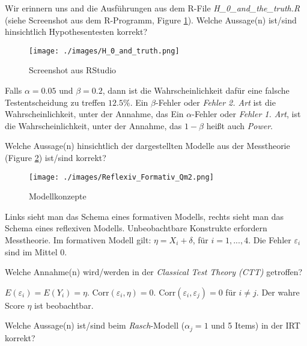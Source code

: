 \documentclass[10pt,addpoints]{exam}
\begin{document}
\begin{questions}
\question Wir erinnern uns and die Ausführungen aus dem R-File \textit{H\_0\_and\_the\_truth.R} (siehe Screenshot aus dem R-Programm, Figure \ref{fig:screenshot_RStudio}). Welche Aussage(n) ist/sind hinsichtlich Hypothesentesten korrekt?

\begin{figure}[H]
\centering
\texttt{[image: ./images/H\_0\_and\_truth.png]}
\caption{Screenshot aus RStudio}
\label{fig:screenshot_RStudio}
\end{figure}

\begin{choices}
\CorrectChoice Falls $\alpha=0.05$ und $\beta=0.2$, dann ist die Wahrscheinlichkeit dafür eine falsche Testentscheidung zu treffen $12.5\%$.
\CorrectChoice Ein $\beta$-Fehler oder \textit{Fehler 2. Art} ist die Wahrscheinlichkeit, unter der Annahme, das
\CorrectChoice Ein $\alpha$-Fehler oder \textit{Fehler 1. Art}, ist die Wahrscheinlichkeit, unter der Annahme, das
\CorrectChoice $1-\beta$ heißt auch \textit{Power}.
\end{choices}

\question Welche Aussage(n) hinsichtlich der dargestellten Modelle aus der Messtheorie (Figure \ref{fig:models}) ist/sind korrekt?

\begin{figure}[H]
\centering
\texttt{[image: ./images/Reflexiv\_Formativ\_Qm2.png]}
\caption{Modellkonzepte}
\label{fig:models}
\end{figure}

\begin{choices}
\choice Links sieht man das Schema eines formativen Modells, rechts sieht man das Schema eines reflexiven Modells.
\CorrectChoice Unbeobachtbare Konstrukte erfordern Messtheorie. 
\choice Im formativen Modell gilt: $\eta = X_i + \delta$, für $i = 1,...,4$.
\CorrectChoice Die Fehler $\varepsilon_i$ sind im Mittel 0.
\end{choices}

\question Welche Annahme(n) wird/werden in der \textit{Classical Test Theory (CTT)} getroffen?

\begin{choices}
\choice $E(\varepsilon_i) = E(Y_i) = \eta$.
\CorrectChoice $\text{Corr}(\varepsilon_i, \eta) = 0$.
\CorrectChoice $\text{Corr}(\varepsilon_i, \varepsilon_j) = 0$ für $i \neq j$.
\choice Der wahre Score $\eta$ ist beobachtbar.
\end{choices}

\question Welche Aussage(n) ist/sind beim \textit{Rasch}-Modell ($\alpha_j=1$ und 5 Items) in der IRT korrekt?


\end{questions}
\end{document}
